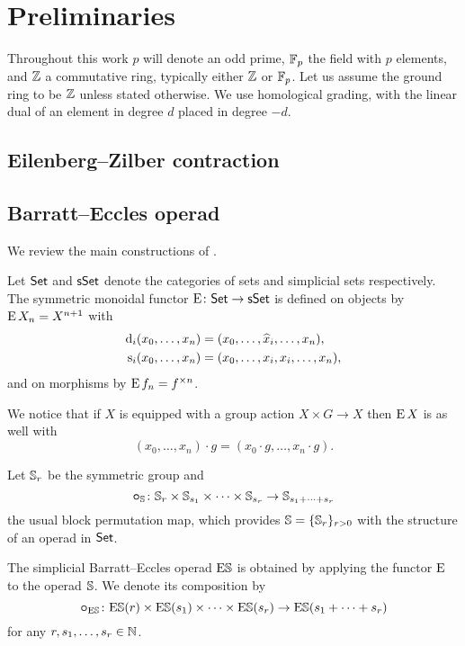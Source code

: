 
\section{Preliminaries}

Throughout this work $p$ will denote an odd prime, ${\mathbb{F}_p}$ the field with $p$ elements, and $\mathbb{Z}$ a commutative ring, typically either $\mathbb{Z}$ or ${\mathbb{F}_p}$.
Let us assume the ground ring to be $\mathbb{Z}$ unless stated otherwise.
We use homological grading, with the linear dual of an element in degree $d$ placed in degree $-d$.

\subsection{Eilenberg--Zilber contraction}

\TBW

\subsection{Barratt--Eccles operad}

We review the main constructions of \cite{berger2004combinatorial}.

\sssec

Let $\mathsf{Set}$ and $\mathsf{sSet}$ denote the categories of sets and simplicial sets respectively.
The symmetric monoidal functor $\operatorname{E} \colon \mathsf{Set} \to \mathsf{sSet}$ is defined on objects by $\operatorname{E} X_n = X^{n+1}$ with
\[
\begin{split}
	\operatorname{d}_i(x_0,\dots,x_n) &= (x_0,\dots,\widehat{x}_i,\dots,x_n), \\
	\operatorname{s}_i(x_0,\dots,x_n) &= (x_0, \dots, x_i, x_i, \dots, x_n),
\end{split}
\]
and on morphisms by $\operatorname{E} f_n = f^{\times n}$.

We notice that if $X$ is equipped with a group action $X \times G \to X$ then $\operatorname{E} X$ is as well with
\[
(x_0,\dots,x_n) \cdot g = (x_0 \cdot g, \dots, x_n \cdot g).
\]

\sssec

Let $\mathbb{S}_r$ be the symmetric group and
\[
\bm{\circ}_{\mathbb{S}} \colon \mathbb{S}_r \times \mathbb{S}_{s_1} \times \cdots \times \mathbb{S}_{s_r} \to \mathbb{S}_{s_1+\dots+s_r}
\]
the usual block permutation map, which provides $\mathbb{S} = \{\mathbb{S}_r\}_{r>0}$ with the structure of an operad in $\mathsf{Set}$.

\sssec

The simplicial Barratt--Eccles operad $\mathrm{E}\mathbb{S}$ is obtained by applying the functor $\operatorname{E}$ to the operad $\mathbb{S}$.
We denote its composition by
\[
\bm{\circ}_{\mathrm{E}\mathbb{S}} \colon \mathrm{E}\mathbb{S}(r) \times \mathrm{E}\mathbb{S}(s_1) \times\dots\times \mathrm{E}\mathbb{S}(s_r) \to \mathrm{E}\mathbb{S}(s_1+\dots+s_r)
\]
for any $r,s_1,\dots,s_r \in \mathbb{N}$.

